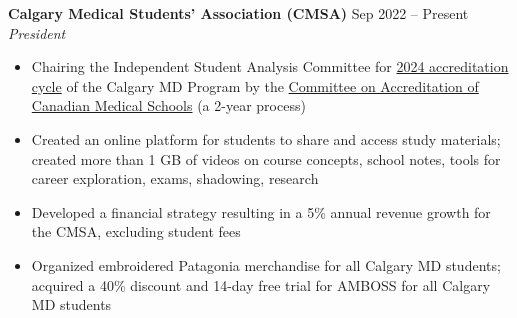 \documentclass{article}
\begin{document}
\begin{itemize}
\end{itemize} \vspace{1em}

\textbf{Calgary Medical Students' Association (CMSA)} \hfill Sep 2022 -- Present \\
\textit{President}
\begin{itemize}
    \item Chairing the Independent Student Analysis Committee for \href{https://cumming.ucalgary.ca/about/ume-accreditation}{2024 accreditation cycle} of the Calgary MD Program by the \href{https://cacms-cafmc.ca/}{Committee on Accreditation of Canadian Medical Schools} (a 2-year process)
    \item Created an online platform for students to share and access study materials; created more than 1 GB of videos on course concepts, school notes, tools for career exploration, exams, shadowing, research
    \item Developed a financial strategy resulting in a 5\% annual revenue growth for the CMSA, excluding student fees
    \item Organized embroidered Patagonia merchandise for all Calgary MD students; acquired a 40\% discount and 14-day free trial for AMBOSS for all Calgary MD students
\end{itemize} \vspace{1em}
\end{document}
